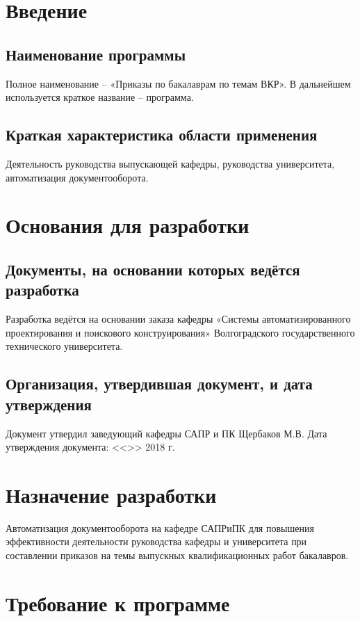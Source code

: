 \documentclass[utf8x]{article}
\begin{document}
\begin{flushleft}

\section{Введение}
\subsection{Наименование программы}
\justifying
Полное наименование – «Приказы по бакалаврам по темам ВКР». В дальнейшем используется краткое название – программа.
\subsection{Краткая характеристика области применения}

Деятельность руководства выпускающей кафедры, руководства университета, автоматизация документооборота.
\section{Основания для разработки}
\subsection{Документы, на основании которых ведётся разработка}

Разработка ведётся на основании заказа кафедры «Системы автоматизированного проектирования и поискового конструирования» Волгоградского государственного технического университета.
\subsection{Организация, утвердившая документ, и дата утверждения}
Документ утвердил заведующий кафедры САПР и ПК Щербаков М.В. \hfill \break
Дата утверждения документа: <<\underline{\quad}>> \underline{\quad\quad\quad\quad\quad\quad} 2018 г.

\section{Назначение разработки}

Автоматизация документооборота на кафедре САПРиПК для повышения эффективности деятельности руководства кафедры и университета при составлении приказов на темы выпускных квалификационных работ бакалавров.

\section{Требование к программе}

\end{flushleft}
\end{document}
